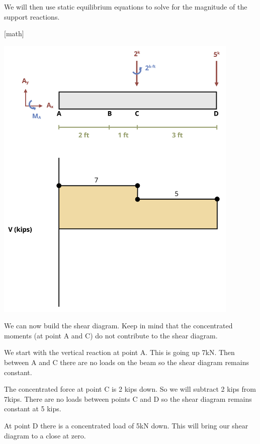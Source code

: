 \documentclass[
  letterpaper,
  DIV=11,
  numbers=noendperiod]{scrreprt}
\begin{document}
\begin{tcolorbox}
We will then use static equilibrium equations to solve for the magnitude
of the support reactions.

{[}math{]}

\begin{center}
\includegraphics[width=4.59375in,height=\textheight]{images/CH7 PNGs/example 7.4 part 3.png}
\end{center}

We can now build the shear diagram. Keep in mind that the concentrated
moments (at point A and C) do not contribute to the shear diagram.

We start with the vertical reaction at point A. This is going up 7kN.
Then between A and C there are no loads on the beam so the shear diagram
remains constant.

The concentrated force at point C is 2 kips down. So we will subtract 2
kips from 7kips. There are no loads between points C and D so the shear
diagram remains constant at 5 kips.

At point D there is a concentrated load of 5kN down. This will bring our
shear diagram to a close at zero.


\end{tcolorbox}
\end{document}
